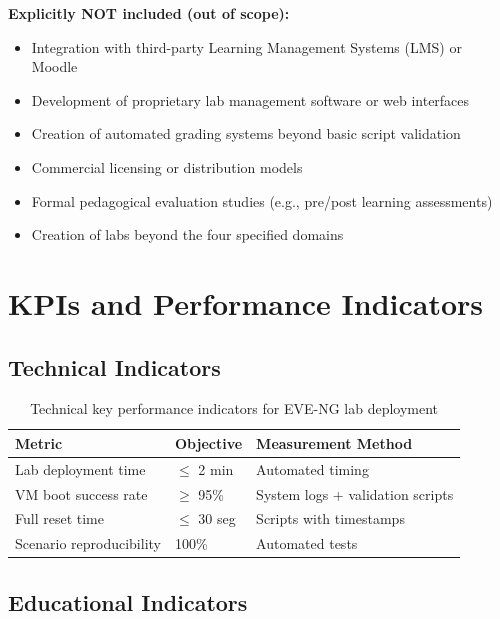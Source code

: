 \textbf{Explicitly NOT included (out of scope):}

\begin{itemize}
    \item Integration with third-party Learning Management Systems (LMS) or Moodle
    \item Development of proprietary lab management software or web interfaces
    \item Creation of automated grading systems beyond basic script validation
    \item Commercial licensing or distribution models
    \item Formal pedagogical evaluation studies 
          (e.g., pre/post learning assessments)
    \item Creation of labs beyond the four specified domains
\end{itemize}


\section{KPIs and Performance Indicators}

\subsection{Technical Indicators}

\begin{table}[H]
  \centering
  \small
  \setlength{\tabcolsep}{4pt}
  \renewcommand{\arraystretch}{1.1}
  \begin{tabularx}{\textwidth}{l l X}
    \toprule
\textbf{Metric} & \textbf{Objective} & \textbf{Measurement Method} \\
\midrule
Lab deployment time & $\leq$ 2 min & Automated timing \\
\midrule
VM boot success rate & $\geq$ 95\% & System logs + validation scripts \\
\midrule
Full reset time & $\leq$ 30 seg & Scripts with timestamps \\
\midrule
Scenario reproducibility & 100\% & Automated tests \\
\bottomrule
\end{tabularx}
  \caption[Technical KPIs]{Technical key performance indicators for EVE-NG lab deployment}
  \label{tab:kpi_technical}
\end{table}

\subsection{Educational Indicators}

